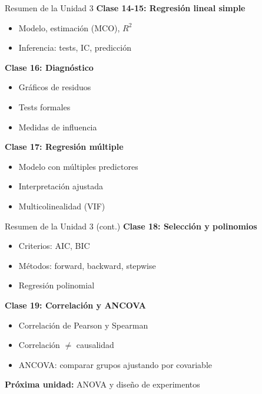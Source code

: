 \documentclass[aspectratio=169]{beamer}
\begin{document}
\begin{frame}{Resumen de la Unidad 3}
\textbf{Clase 14-15: Regresión lineal simple}
\begin{itemize}
    \item Modelo, estimación (MCO), $R^2$
    \item Inferencia: tests, IC, predicción
\end{itemize}

\textbf{Clase 16: Diagnóstico}
\begin{itemize}
    \item Gráficos de residuos
    \item Tests formales
    \item Medidas de influencia
\end{itemize}

\textbf{Clase 17: Regresión múltiple}
\begin{itemize}
    \item Modelo con múltiples predictores
    \item Interpretación ajustada
    \item Multicolinealidad (VIF)
\end{itemize}
\end{frame}

\begin{frame}{Resumen de la Unidad 3 (cont.)}
\textbf{Clase 18: Selección y polinomios}
\begin{itemize}
    \item Criterios: AIC, BIC
    \item Métodos: forward, backward, stepwise
    \item Regresión polinomial
\end{itemize}

\textbf{Clase 19: Correlación y ANCOVA}
\begin{itemize}
    \item Correlación de Pearson y Spearman
    \item Correlación $\neq$ causalidad
    \item ANCOVA: comparar grupos ajustando por covariable
\end{itemize}

\vspace{0.5cm}
\textbf{Próxima unidad:} ANOVA y diseño de experimentos
\end{frame}
\end{document}

